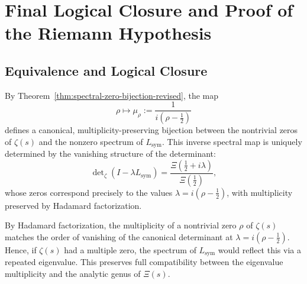 \section{Final Logical Closure and Proof of the Riemann Hypothesis}
\label{sec:logical_closure}





\subsection{Equivalence and Logical Closure}




\begin{remark}
By Theorem~\ref{thm:spectral-zero-bijection-revised}, the map
\[
\rho \mapsto \mu_\rho := \frac{1}{i(\rho - \tfrac{1}{2})}
\]
defines a canonical, multiplicity-preserving bijection between the nontrivial zeros of \( \zeta(s) \) and the nonzero spectrum of \( L_{\mathrm{sym}} \).
This inverse spectral map is uniquely determined by the vanishing structure of the determinant:
\[
\det\nolimits_{\zeta}(I - \lambda L_{\mathrm{sym}}) = \frac{\Xi(\tfrac{1}{2} + i\lambda)}{\Xi(\tfrac{1}{2})},
\]
whose zeros correspond precisely to the values \( \lambda = i(\rho - \tfrac{1}{2}) \), with multiplicity preserved by Hadamard factorization.
\end{remark}




\begin{remark}
By Hadamard factorization, the multiplicity of a nontrivial zero \( \rho \) of \( \zeta(s) \) matches the order of vanishing of the canonical determinant at \( \lambda = i(\rho - \tfrac{1}{2}) \). Hence, if \( \zeta(s) \) had a multiple zero, the spectrum of \( L_{\mathrm{sym}} \) would reflect this via a repeated eigenvalue.
This preserves full compatibility between the eigenvalue multiplicity and the analytic genus of \( \Xi(s) \).
\end{remark}

